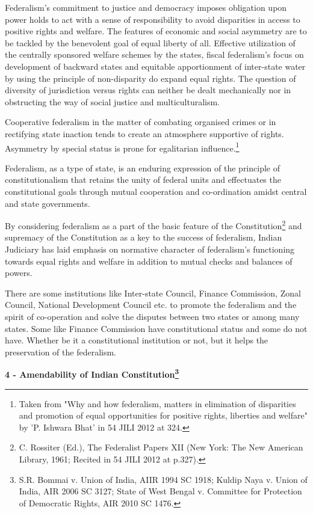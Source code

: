 \begin{multicols}{2}
\noi
Federalism's commitment to justice and democracy imposes obligation upon power holds to act
with a sense of responsibility to avoid disparities in access to positive rights and welfare. The
features of economic and social asymmetry are to be tackled by the benevolent goal of equal
liberty of all. Effective utilization of the centrally sponsored welfare schemes by the states, fiscal
federalism's focus on development of backward states and equitable apportionment of inter-state
water by using the principle of non-disparity do expand equal rights. The question of diversity of
jurisdiction versus rights can neither be dealt mechanically nor in obstructing the way of social
justice and multiculturalism.

\noi
Cooperative federalism in the matter of combating organised crimes or in rectifying state inaction
tends to create an atmosphere supportive of rights. Asymmetry by special status is prone for
egalitarian influence.\footnote{Taken from "Why and how federalism, matters in elimination of disparities and promotion of equal opportunities for positive rights, liberties and welfare" by 'P. Ishwara Bhat' in 54 JILI 2012 at 324.}

\noi
Federalism, as a type of state, is an enduring expression of the principle of constitutionalism that
retains the unity of federal units and effectuates the constitutional goals through mutual cooperation and co-ordination amidst central and state governments.

\noi
By considering federalism as a part of the basic feature of the Constitution\footnote{C. Rossiter (Ed.), The Federalist Papers XII (New York: The New American Library, 1961; Recited in 54 JILI 2012 at p.327).} and supremacy of the Constitution as a key to the success of federalism, Indian Judiciary has laid emphasis on normative character of federalism's functioning towards equal rights and welfare in addition to mutual checks and balances of powers.

\noi
There are some institutions like Inter-state Council, Finance Commission, Zonal Council,
National Development Council etc. to promote the federalism and the spirit of co-operation and
solve the disputes between two states or among many states. Some like Finance Commission have
constitutional status and some do not have. Whether be it a constitutional institution or not, but it
helps the preservation of the federalism.

\noi
{\large \bfseries 4 - Amendability of Indian Constitution\footnote{S.R. Bommai v. Union of India, AIIR 1994 SC 1918; Kuldip Naya v. Union of India, AIR 2006 SC 3127; State of West Bengal v. Committee for Protection of Democratic Rights, AIR 2010 SC 1476.}}


\end{multicols}
